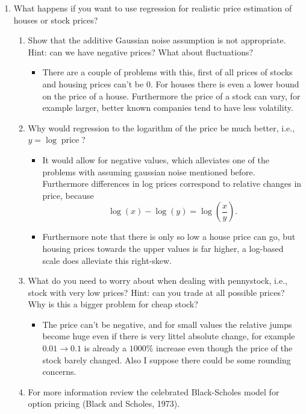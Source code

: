 \documentclass{article}
\begin{document}
\begin{enumerate}[label=\arabic*.]
\begin{itemize}
	\end{itemize}
\item What happens if you want to use regression for realistic price estimation of houses or stock prices?
	\begin{enumerate}[label=\arabic*.]
	\item Show that the additive Gaussian noise assumption is not appropriate. Hint: can we have negative prices? What about fluctuations?
		\begin{itemize}
			\item There are a couple of problems with this, first of all prices of stocks and housing prices can't be $0$. For houses there is even a lower bound on the price of a house. Furthermore the price of a stock can vary, for example larger, better known companies tend to have less volatility.
		\end{itemize}
	\item Why would regression to the logarithm of the price be much better, i.e., $y = \log \operatorname{price}$?
		\begin{itemize}
			\item It would allow for negative values, which alleviates one of the problems with assuming gaussian noise mentioned before. Furthermore differences in log prices correspond to relative changes in price, because
			$$
			\log(x) - \log(y) = \log\left(\frac{x}{y}\right).
			$$
			\item Furthermore note that there is only so low a house price can go, but housing prices towards the upper values is far higher, a log-based scale does alleviate this right-skew.
		\end{itemize}
	\item What do you need to worry about when dealing with pennystock, i.e., stock with very low prices? Hint: can you trade at all possible prices? Why is this a bigger problem for cheap stock?
		\begin{itemize}
			\item The price can't be negative, and for small values the relative jumps become huge even if there is very littel absolute change, for example $0.01 \rightarrow 0.1$ is already a $1000\%$ increase even though the price of the stock barely changed. Also I suppose there could be some rounding concerns.
		\end{itemize}
	\item For more information review the celebrated Black-Scholes model for option pricing (Black and Scholes, 1973).
		\begin{itemize}

\end{itemize}
\end{enumerate}
\end{enumerate}
\end{document}
